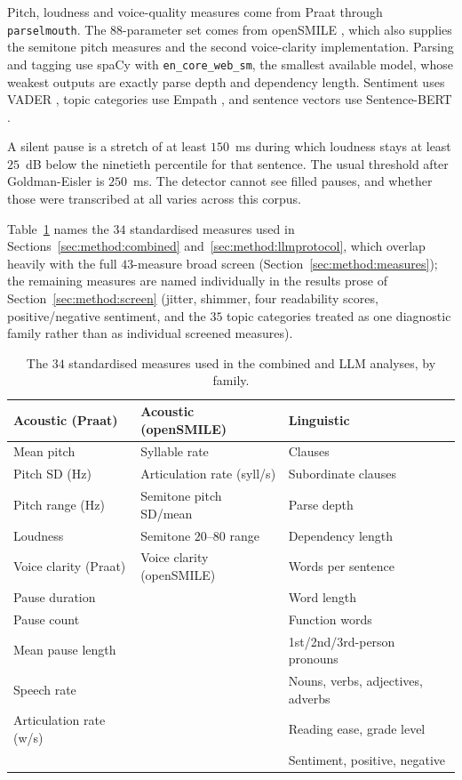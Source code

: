 \documentclass[journal]{IEEEtran}
\begin{document}
Pitch, loudness and voice-quality measures come from Praat
\cite{boersma2024praat} through \texttt{parselmouth}. The $88$-parameter set
comes from openSMILE \cite{eyben2010opensmile,eyben2016gemaps}, which also
supplies the semitone pitch measures and the second voice-clarity
implementation. Parsing and tagging use spaCy \cite{honnibal2020spacy} with
\texttt{en\_core\_web\_sm}, the smallest available model, whose weakest
outputs are exactly parse depth and dependency length. Sentiment uses VADER
\cite{hutto2014vader}, topic categories use Empath \cite{fast2016empath}, and
sentence vectors use Sentence-BERT \cite{reimers2019sbert}.

A silent pause is a stretch of at least $150$~ms during which loudness stays
at least $25$~dB below the ninetieth percentile for that sentence. The usual
threshold after Goldman-Eisler \cite{goldman1968psycholinguistics} is
$250$~ms. The detector cannot see filled pauses, and whether those were
transcribed at all varies across this corpus.

Table~\ref{tab:featuredict} names the $34$ standardised measures used in
Sections~\ref{sec:method:combined} and~\ref{sec:method:llmprotocol}, which
overlap heavily with the full $43$-measure broad screen (Section~\ref{sec:method:measures});
the remaining measures are named individually in the results prose of
Section~\ref{sec:method:screen} (jitter, shimmer, four readability scores,
positive/negative sentiment, and the $35$ topic categories treated as one
diagnostic family rather than as individual screened measures).

\begin{table}[h]
\caption{The $34$ standardised measures used in the combined and LLM
analyses, by family.}
\label{tab:featuredict}
\centering
\scriptsize
\setlength{\tabcolsep}{2pt}
\begin{tabular}{p{}p{}p{}}
\toprule
Acoustic (Praat) & Acoustic (openSMILE) & Linguistic \\
\midrule
Mean pitch & Syllable rate & Clauses \\
Pitch SD (Hz) & Articulation rate (syll/s) & Subordinate clauses \\
Pitch range (Hz) & Semitone pitch SD/mean & Parse depth \\
Loudness & Semitone $20$--$80$ range & Dependency length \\
Voice clarity (Praat) & Voice clarity (openSMILE) & Words per sentence \\
Pause duration & & Word length \\
Pause count & & Function words \\
Mean pause length & & 1st/2nd/3rd-person pronouns \\
Speech rate & & Nouns, verbs, adjectives, adverbs \\
Articulation rate (w/s) & & Reading ease, grade level \\
 & & Sentiment, positive, negative \\
\bottomrule
\end{tabular}
\end{table}
\end{document}
